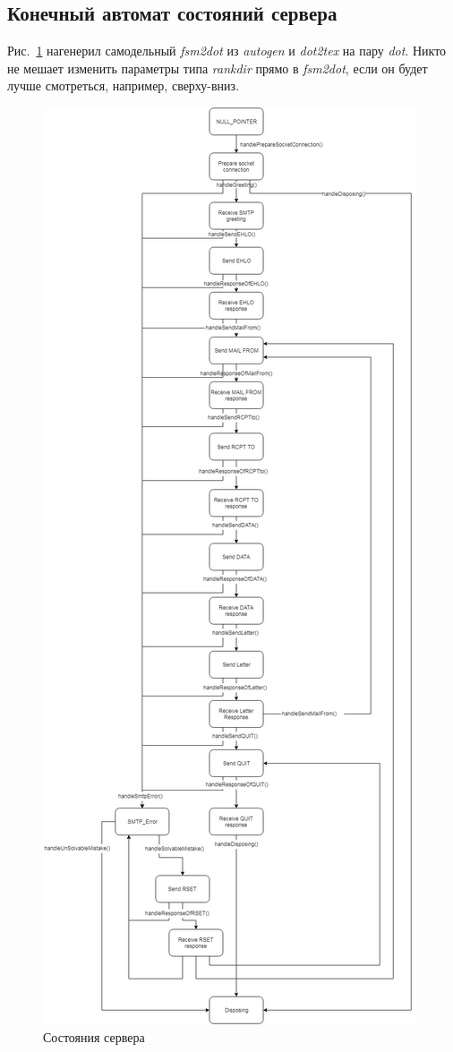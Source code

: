\documentclass[a4paper,12pt]{report}
\begin{document}
\subsection*{Конечный автомат состояний сервера}

Рис.~\ref{fig:fsm} нагенерил самодельный \textit{fsm2dot} из \textit{autogen} и \textit{dot2tex} на пару \textit{dot}. Никто не мешает изменить параметры типа \textit{rankdir} прямо в \textit{fsm2dot}, если он будет лучше смотреться, например, сверху-вниз.

\begin{figure}
\centering
\includegraphics[height=\textheight]{static/ClientDiagram_Final.jpg}
\caption{Состояния сервера}
\label{fig:fsm}
\end{figure}
\end{document}
